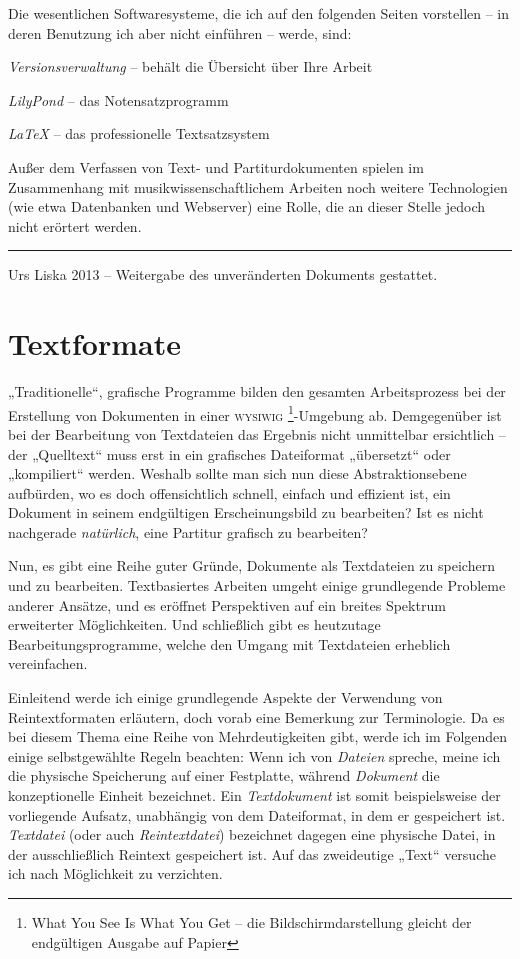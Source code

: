 \documentclass[DIV=12]{scrreprt}
\begin{document}
Die wesentlichen Softwaresysteme, die ich auf den folgenden Seiten vorstellen -- in deren Benutzung ich aber nicht einführen -- werde, sind:

\begin{itemize*}
\item \emph{Versionsverwaltung} -- behält die Übersicht über Ihre Arbeit
\item \emph{LilyPond} -- das Notensatzprogramm
\item \emph{\LaTeX} -- das professionelle Textsatzsystem
\end{itemize*}

Außer dem Verfassen von Text- und Partiturdokumenten spielen im Zusammenhang mit musikwissenschaftlichem Arbeiten noch weitere Technologien (wie etwa Datenbanken und Webserver) eine Rolle, die an dieser Stelle jedoch nicht erörtert werden.

\vfill
\hrule
\medskip
\textcopyright{} Urs Liska 2013 -- Weitergabe des unveränderten Dokuments gestattet.

\tableofcontents

\chapter{Textformate}
\label{chap:pt_plain-text-format}
„Traditionelle“, grafische Programme bilden den gesamten Arbeitsprozess bei der Erstellung von Dokumenten in einer \textsc{wysiwig%
\footnote{What You See Is What You Get -- die Bildschirmdarstellung gleicht der endgültigen Ausgabe auf Papier}}-Umgebung ab.
Demgegenüber ist bei der Bearbeitung von Textdateien das Ergebnis nicht unmittelbar ersichtlich -- der „Quelltext“ muss erst in ein grafisches Dateiformat „übersetzt“ oder „kompiliert“ werden.
Weshalb sollte man sich nun diese Abstraktionsebene aufbürden, wo es doch offensichtlich schnell, einfach und effizient ist, ein Dokument in seinem endgültigen Erscheinungsbild zu bearbeiten?
Ist es nicht nachgerade \emph{natürlich}, eine Partitur grafisch zu bearbeiten?

Nun, es gibt eine Reihe guter Gründe, Dokumente als Textdateien zu speichern und zu bearbeiten.
Textbasiertes Arbeiten umgeht einige grundlegende Probleme anderer Ansätze, und es eröffnet Perspektiven auf ein breites Spektrum erweiterter Möglichkeiten.
Und schließlich gibt es heutzutage Bearbeitungsprogramme, welche den Umgang mit Textdateien erheblich vereinfachen.

Einleitend werde ich einige grundlegende Aspekte der Verwendung von Reintextformaten erläutern, doch vorab eine Bemerkung zur Terminologie.
Da es bei diesem Thema eine Reihe von Mehrdeutigkeiten gibt, werde ich im Folgenden einige selbstgewählte Regeln beachten:
Wenn ich von \emph{Dateien} spreche, meine ich die physische Speicherung auf einer Festplatte, während \emph{Dokument} die konzeptionelle Einheit bezeichnet.
Ein \emph{Textdokument} ist somit beispielsweise der vorliegende Aufsatz, unabhängig von dem Dateiformat, in dem er gespeichert ist.
\emph{Textdatei} (oder auch \emph{Reintextdatei}) bezeichnet dagegen eine physische Datei, in der ausschließlich Reintext gespeichert ist.
Auf das zweideutige „Text“ versuche ich nach Möglichkeit zu verzichten.
\end{document}
